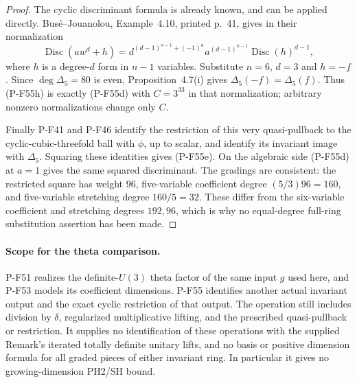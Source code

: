 \documentclass[11pt,a4paper]{article}
\begin{document}
\begin{proof}
The cyclic discriminant formula is already known, and can
be applied directly. Bus\'e--Jouanolou, Example~4.10,
printed p.~41, gives in their normalization
\[
 \operatorname{Disc}(a w^d+h)
   =d^{(d-1)^{n-1}+(-1)^n}
       a^{(d-1)^{n-1}}\operatorname{Disc}(h)^{d-1},
 \tag{P-F55h}
\]
where $h$ is a degree-$d$ form in $n-1$ variables.
Substitute $n=6$, $d=3$ and $h=-f$.
Since $\deg\Delta_5=80$ is even, Proposition~4.7(i)
gives $\Delta_5(-f)=\Delta_5(f)$. Thus (P-F55h)
is exactly (P-F55d) with $C=3^{33}$ in that normalization;
arbitrary nonzero normalizations change only $C$.

Finally P-F41 and P-F46 identify the restriction of this very
quasi-pullback to the cyclic-cubic-threefold ball with $\phi$,
up to scalar, and identify its invariant image with $\Delta_5$.
Squaring these identities gives (P-F55e). On the algebraic
side (P-F55d) at $a=1$ gives the same squared discriminant.
The gradings are consistent: the restricted square has weight
$96$, five-variable coefficient degree $(5/3)96=160$, and
five-variable stretching degree $160/5=32$.
These differ from the six-variable coefficient and stretching
degrees $192,96$, which is why no equal-degree full-ring
substitution assertion has been made.
\end{proof}

\paragraph{Scope for the theta comparison.}
P-F51 realizes the definite-$U(3)$ theta factor of the same
input $g$ used here, and P-F53 models its coefficient dimensions.
P-F55 identifies another actual invariant output and the exact
cyclic restriction of that output. The operation still includes
division by $\delta$, regularized multiplicative lifting, and
the prescribed quasi-pullback or restriction. It supplies no
identification of these operations with the supplied Remark's
iterated totally definite unitary lifts, and no basis or positive
dimension formula for all graded pieces of either invariant
ring. In particular it gives no growing-dimension PH2/SH bound.
\end{document}
